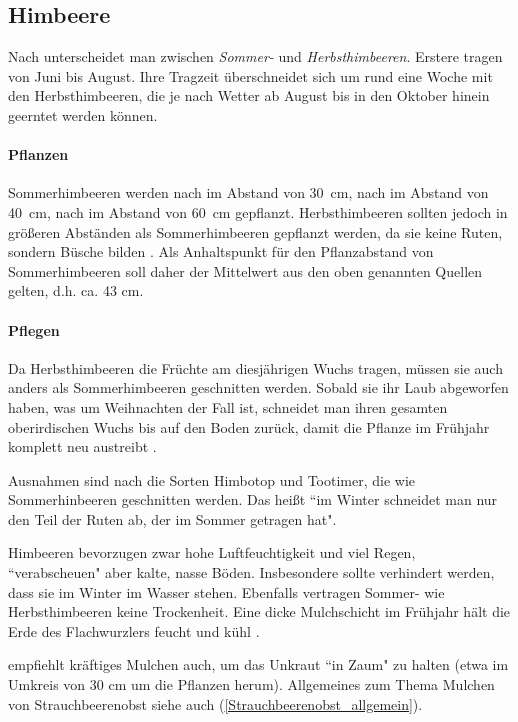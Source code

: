 \subsection{Himbeere}
\label{Himbeere}

Nach \citet[S.~420]{Don2021} unterscheidet man zwischen \textit{Sommer-} und \textit{Herbsthimbeeren}.
Erstere tragen von Juni bis August.
Ihre Tragzeit überschneidet sich um rund eine Woche mit den Herbsthimbeeren, die je nach Wetter ab August bis in den Oktober hinein geerntet werden können.

\paragraph{Pflanzen}

Sommerhimbeeren werden nach \citet[S.~175]{Seymour1978} im Abstand von 30~cm, nach \citet[S.~XY]{Stangl1995} im Abstand von 40~cm, nach \citet[S.~420]{Don2021} im Abstand von 60~cm gepflanzt.
Herbsthimbeeren sollten jedoch in größeren Abständen als Sommerhimbeeren gepflanzt werden, da sie keine Ruten, sondern Büsche bilden \citep[S.~420]{Don2021}.
Als Anhaltspunkt für den Pflanzabstand von Sommerhimbeeren soll daher der Mittelwert aus den oben genannten Quellen gelten, d.h. ca. 43 cm.

\paragraph{Pflegen}

Da Herbsthimbeeren die Früchte am diesjährigen Wuchs tragen, müssen sie auch anders als Sommerhimbeeren geschnitten werden.
Sobald sie ihr Laub abgeworfen haben, was um Weihnachten der Fall ist, schneidet man ihren gesamten oberirdischen Wuchs bis auf den Boden zurück, damit die Pflanze im Frühjahr komplett neu austreibt \citep[S.~421]{Don2021}.

Ausnahmen sind nach \citet{Schwinn2022} die Sorten Himbotop und Tootimer, die wie Sommerhinbeeren geschnitten werden.
Das heißt ``im Winter schneidet man nur den Teil der Ruten ab, der im Sommer getragen hat".

Himbeeren bevorzugen zwar hohe Luftfeuchtigkeit und viel Regen, ``verabscheuen" aber kalte, nasse Böden.
Insbesondere sollte verhindert werden, dass sie im Winter im Wasser stehen.
Ebenfalls vertragen Sommer- wie Herbsthimbeeren keine Trockenheit.
Eine dicke Mulchschicht im Frühjahr hält die Erde des Flachwurzlers feucht und kühl \citep[S.~421]{Don2021}.

\citet[S.~176]{Seymour1978} empfiehlt kräftiges Mulchen auch, um das Unkraut ``in Zaum" zu halten (etwa im Umkreis von 30 cm um die Pflanzen herum).
Allgemeines zum Thema Mulchen von Strauchbeerenobst siehe auch (\ref{Strauchbeerenobst_allgemein}).

